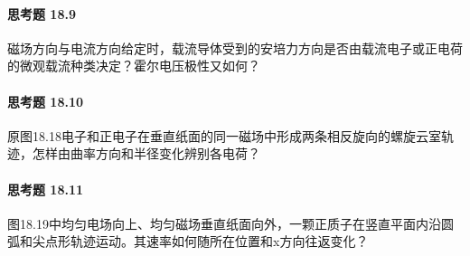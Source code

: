 \paragraph{思考题 18.9}
磁场方向与电流方向给定时，载流导体受到的安培力方向是否由载流电子或正电荷的微观载流种类决定？霍尔电压极性又如何？

\paragraph{思考题 18.10}
原图18.18电子和正电子在垂直纸面的同一磁场中形成两条相反旋向的螺旋云室轨迹，怎样由曲率方向和半径变化辨别各电荷？

\paragraph{思考题 18.11}
图18.19中均匀电场向上、均匀磁场垂直纸面向外，一颗正质子在竖直平面内沿圆弧和尖点形轨迹运动。其速率如何随所在位置和x方向往返变化？
